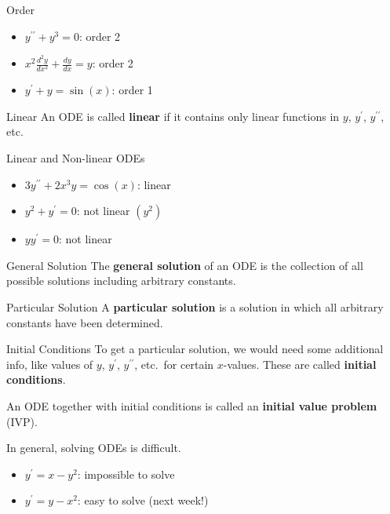 \begin{Example}{Order}{}
    \begin{itemize}
        \item $ y^{\prime\prime}+y^3=0 $: order 2
        \item $ x^2 \frac{d^2y}{dx^2} +\frac{dy}{dx} =y $: order 2
        \item $ y^\prime+y=\sin(x) $: order 1
    \end{itemize}
\end{Example}

\begin{Definition}{Linear}{}
    An ODE is called \textbf{linear} if it contains only linear functions in $ y $, $ y^\prime $,
    $ y^{\prime\prime} $, etc.
\end{Definition}

\begin{Example}{Linear and Non-linear ODEs}{}
    \begin{itemize}
        \item $ 3y^{\prime\prime}+2x^3y=\cos(x) $: linear
        \item $ y^2+y^\prime=0 $: not linear $ (y^2) $
        \item $ yy^\prime=0 $: not linear
    \end{itemize}
\end{Example}

\begin{Definition}{General Solution}{}
    The \textbf{general solution} of an ODE is the collection of all possible
    solutions including arbitrary constants.
\end{Definition}

\begin{Definition}{Particular Solution}{}
    A \textbf{particular solution} is a solution in which all arbitrary constants
    have been determined.
\end{Definition}

\begin{Definition}{Initial Conditions}{}
    To get a particular solution, we would need some additional info, like values of $ y $,
    $ y^\prime $, $ y^{\prime\prime} $, etc.\ for certain $ x $-values. These are
    called \textbf{initial conditions}.
\end{Definition}

An ODE together with initial conditions is called an \textbf{initial value problem} (IVP).

In general, solving ODEs is difficult.
\begin{Example}{}{}
    \begin{itemize}
        \item $ y^{\prime}=x-y^2 $: impossible to solve
        \item $ y^\prime=y-x^2 $: easy to solve (next week!)
    \end{itemize}
\end{Example}

